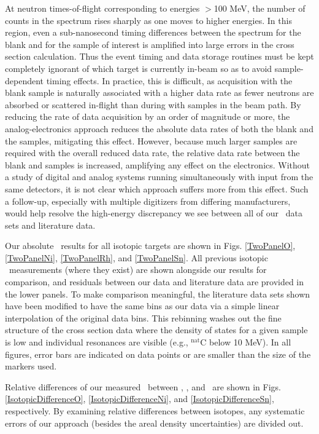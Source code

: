 At neutron times-of-flight corresponding to energies $>$100 MeV, the number of
counts in the spectrum rises sharply as one moves to higher energies. In this
region, even a sub-nanosecond timing differences between the spectrum for the
blank and for the sample of interest is amplified into large errors in the
cross section calculation. Thus the event timing and data
storage routines must be kept completely ignorant of which target is currently
in-beam so as to avoid sample-dependent timing effects. In practice, this is
difficult, as acquisition with the blank sample is naturally associated with
a higher data rate as fewer neutrons are absorbed or scattered in-flight than during
with samples in the beam path. By reducing the rate of data acquisition
by an order of magnitude or more, the analog-electronics approach reduces the
absolute data rates of both the blank and the samples, mitigating this effect.
However, because much larger samples are required with the overall reduced data
rate, the relative data rate between the blank and samples is increased,
amplifying any effect on the electronics. Without a study of digital and analog
systems running simultaneously with input from the same detectors, it is not
clear which approach suffers more from this effect. Such a follow-up, especially
with multiple digitizers from differing manufacturers, would help
resolve the high-energy discrepancy we see between all of our \tot\ data sets
and literature data.

Our absolute \tot\ results for all isotopic targets are shown in Figs.
\ref{TwoPanelO}, \ref{TwoPanelNi}, \ref{TwoPanelRh}, and \ref{TwoPanelSn}.
All previous isotopic \tot\
measurements (where they exist) are shown alongside our results for comparison, and residuals 
between our data and literature data are provided in the lower panels. To make comparison 
meaningful, the literature
data sets shown have been modified to have the same bins as our data via a simple
linear interpolation of the original data bins. This rebinning
washes out the fine structure of the cross section data where the density of states
for a given sample is low and individual resonances are visible
(e.g., $^{\text{nat}}$C below 10 MeV). In all figures, error bars are indicated on data
points or are smaller than the size of the markers used.

Relative differences of our measured \tot\ between \oSixEight, \niEightFour, and
\snTwelveFour\ are shown in Figs. \ref{IsotopicDifferenceO}, \ref{IsotopicDifferenceNi}, 
and \ref{IsotopicDifferenceSn}, respectively. By examining relative differences between
isotopes, any systematic errors of our approach (besides the areal density uncertainties)
are divided out.

